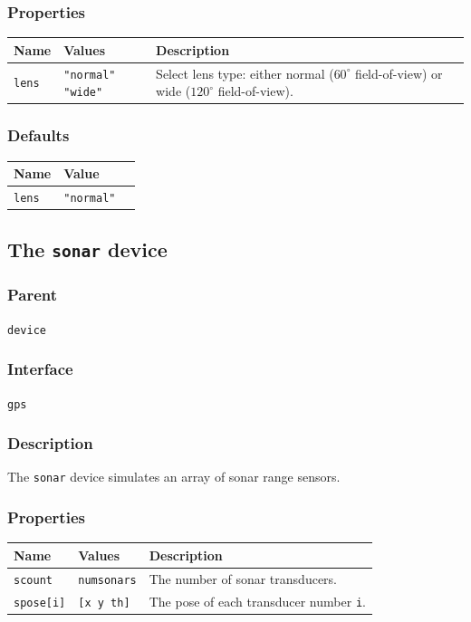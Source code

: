 \documentclass[11pt,twoside]{report}
\begin{document}
\subsubsection*{Properties}
\begin{tabularx}{\columnwidth}{llX}
\hline
Name & Values & Description \\
\hline
\verb'lens' & \verb'"normal"' \verb'"wide"' & Select lens type: either
normal ($60^\circ$ field-of-view) or wide ($120^\circ$
field-of-view).\\
\hline
\end{tabularx}

\subsubsection*{Defaults}
\begin{tabularx}{\columnwidth}{llX}
\hline
Name & Value\\
\hline
\verb'lens' & \verb'"normal"'\\
\hline
\end{tabularx}

\newpage
\subsection{The {\tt sonar} device}

\subsubsection*{Parent}
{\tt device}

\subsubsection*{Interface}
{\tt gps}

\subsubsection*{Description}
The {\tt sonar} device simulates an array of sonar range sensors.

\subsubsection*{Properties}
\begin{tabularx}{\columnwidth}{llX}
\hline
Name & Values & Description \\
\hline
\verb'scount' & \verb'numsonars' & The number of sonar transducers.\\
\verb'spose[i]' & \verb'[x y th]' & The pose of each transducer number {\tt i}.\\
\hline
\end{tabularx}
\end{document}
